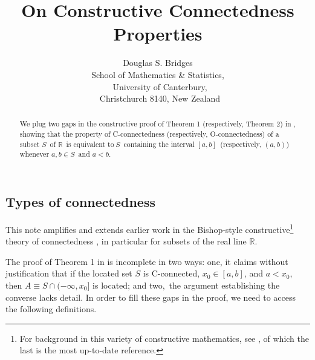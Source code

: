 \documentclass[11pt]{article}%
\begin{document}
\title{On \textsf{Constructive Connectedness Properties}}
\author{\textsf{Douglas S. Bridges}\\\textsf{School of Mathematics \& Statistics,}\\\textsf{\ University of Canterbury,}\\\textsf{\ Christchurch 8140, New Zealand}}
\maketitle

\begin{abstract}%
\noindent
\textsf{We plug two gaps in the constructive proof of Theorem 1 (respectively,
Theorem 2) in \cite{dsb}, showing that the property of C-connectedness
(respectively, O-connectedness) of a subset }$S$\textsf{\ of }$\mathbb{R}%
$\textsf{\ is equivalent to}$\ S$\textsf{\ containing the interval }$\left[
a,b\right]  $\textsf{\ (respectively, }$\left(  a,b\right)  $)
\textsf{whenever }$a,b\in S$\textsf{\ and }$a<b$\textsf{. }

\end{abstract}

%

\normalfont\sf
\setcounter{secnumdepth}{0}%


\subsection{Types of connectedness}

This note amplifies and extends earlier work in the Bishop-style
constructive\footnote{%
\normalfont\sf
For background in this variety of constructive mathematics, see
\cite{Bishop,BB,bv,Handbook}, of which the last is the most up-to-date
reference.} theory of connectedness \cite{dsb,dsb78a,dsbcon77,MarkM78,MarkM79}%
, in particular for subsets of the real line $\mathbb{R}$.

The proof of Theorem 1 in \cite{dsb} is incomplete in two ways: one, it claims
without justification that if the located set $S$ is C-connected, $x_{0}%
\in\left[  a,b\right]  $, and $a<x_{0}$, then $A\equiv S\cap(-\infty,x_{0}]$
is located; and two,\ the argument establishing the converse lacks detail. In
order to fill these gaps in the proof, we need to access the following definitions.
\end{document}
